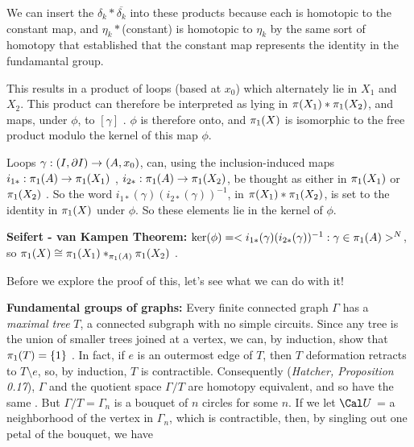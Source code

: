 

We can insert the $\delta_k*\overline{\delta_k}$ into these products because each is
homotopic to the constant map, and $\eta_k*$(constant) is homotopic to $\eta_k$ by the same sort of homotopy
that established that the constant map represents the identity in the fundamantal group.

\msk

This results in a product of loops (based at $x_0$) which alternately lie in $X_1$ and $X_2$. This product can
therefore be interpreted as lying in $\pi(X_1)*\pi_1(X_2)$, and maps, under $\phi$, to $[\gamma]$ .
$\phi$ is therefore onto, and
$\pi_1(X)$ is isomorphic to the free product modulo the kernel of this map $\phi$. 

\msk

Loops $\gamma:(I,\partial I)\rightarrow (A,x_0)$, can, using the inclusion-induced maps  
$i_{1*}:\pi_1(A)\rightarrow \pi_1(X_1)$ , $i_{2*}:\pi_1(A)\rightarrow \pi_1(X_2)$, be thought as either in 
$\pi_1(X_1)$ or $\pi_1(X_2)$ . So the word $i_{1*}(\gamma)(i_{2*}(\gamma))^{-1}$, in 
$\pi(X_1)*\pi_1(X_2)$, is set to the identity in $\pi_1(X)$ under $\phi$. So these 
elements lie in the kernel of $\phi$.

\msk

{\bf Seifert - van Kampen Theorem:} $\ker(\phi) = <i_{1*}(\gamma)(i_{2*}(\gamma))^{-1} : \gamma\in\pi_1(A) >^N$,
so $\pi_1(X)\cong \pi_1(X_1)*_{\pi_1(A)}\pi_1(X_2)$ . 

\bsk

Before we explore the proof of this, let's see what we can do with it!

\msk

{\bf Fundamental groups of graphs:} Every finite connected graph $\Gamma$ has a {\it maximal tree} $T$,
a connected subgraph with no simple circuits. Since any tree is the 
union of smaller trees joined at a vertex, we can, by induction, show that 
$\pi_1(T) = \{ 1\}$ . In fact, if $e$ is an outermost edge of $T$, then 
$T$ deformation retracts to $T\setminus e$, so, by induction, $T$ is 
contractible. Consequently ({\it Hatcher, Proposition 0.17}), $\Gamma$ and the quotient space $\Gamma/T$
are homotopy equivalent, and so have the same \mpu . But $\Gamma/T=\Gamma_n$
is a bouquet of $n$ circles for some $n$. If we let ${\Cal U}$ = a neighborhood of 
the vertex in $\Gamma_n$, which is contractible, then, by singling out one petal of the bouquet,
we have

